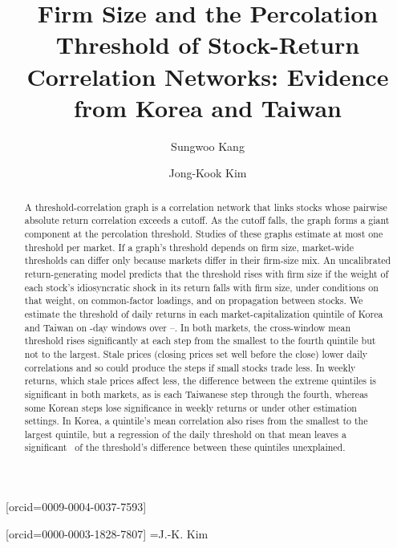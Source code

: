 \documentclass[a4paper,fleqn]{cas-sc}
\makeatletter
\def\eadname#1{\@eadauthor={#1}}
\makeatother
\begin{document}
\let\WriteBookmarks\relax


\title[mode=title]{Firm Size and the Percolation Threshold of Stock-Return Correlation Networks: Evidence from Korea and Taiwan}

\author[1]{Sungwoo Kang}[orcid=0009-0004-0037-7593]

\author[2]{Jong-Kook Kim}[orcid=0000-0003-1828-7807]
\cormark[1]
\eadname{J.-K. Kim} %




\begin{abstract}
\noindent A threshold-correlation graph is a correlation network that links stocks whose pairwise absolute return correlation exceeds a cutoff. As the cutoff falls, the graph forms a giant component at the percolation threshold. Studies of these graphs estimate at most one threshold per market. If a graph's threshold depends on firm size, market-wide thresholds can differ only because markets differ in their firm-size mix. An uncalibrated return-generating model predicts that the threshold rises with firm size if the weight of each stock's idiosyncratic shock in its return falls with firm size, under conditions on that weight, on common-factor loadings, and on propagation between stocks. We estimate the threshold of daily returns in each market-capitalization quintile of Korea and Taiwan on \paperWindowDays-day windows over \paperSampleStart--\paperSampleEnd. In both markets, the cross-window mean threshold rises significantly at each step from the smallest to the fourth quintile but not to the largest. Stale prices (closing prices set well before the close) lower daily correlations and so could produce the steps if small stocks trade less. In weekly returns, which stale prices affect less, the difference between the extreme quintiles is significant in both markets, as is each Taiwanese step through the fourth, whereas some Korean steps lose significance in weekly returns or under other estimation settings. In Korea, a quintile's mean correlation also rises from the smallest to the largest quintile, but a regression of the daily threshold on that mean leaves a significant \rhoCResidGapPctOfRaw\ of the threshold's difference between these quintiles unexplained.
\end{abstract}
\end{document}
